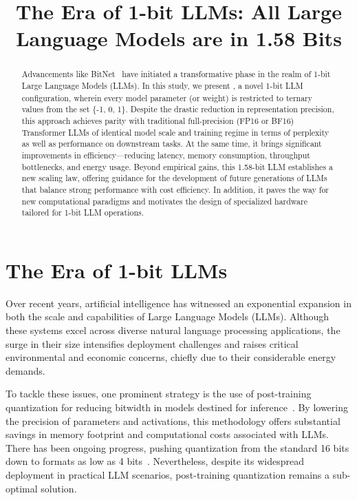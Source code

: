 \title{The Era of 1-bit LLMs: All Large Language Models are in 1.58 Bits}

\begin{abstract}
Advancements like BitNet~\cite{bitnet} have initiated a transformative phase in the realm of 1-bit Large Language Models (LLMs). In this study, we present \textbf{}, a novel 1-bit LLM configuration, wherein every model parameter (or weight) is restricted to ternary values from the set \{-1, 0, 1\}. Despite the drastic reduction in representation precision, this approach achieves parity with traditional full-precision (FP16 or BF16) Transformer LLMs of identical model scale and training regime in terms of perplexity as well as performance on downstream tasks. At the same time, it brings significant improvements in efficiency—reducing latency, memory consumption, throughput bottlenecks, and energy usage. Beyond empirical gains, this 1.58-bit LLM establishes a new scaling law, offering guidance for the development of future generations of LLMs that balance strong performance with cost efficiency. In addition, it paves the way for new computational paradigms and motivates the design of specialized hardware tailored for 1-bit LLM operations.
\end{abstract}

\section{The Era of 1-bit LLMs}

Over recent years, artificial intelligence has witnessed an exponential expansion in both the scale and capabilities of Large Language Models (LLMs). Although these systems excel across diverse natural language processing applications, the surge in their size intensifies deployment challenges and raises critical environmental and economic concerns, chiefly due to their considerable energy demands.

To tackle these issues, one prominent strategy is the use of post-training quantization for reducing bitwidth in models destined for inference~\cite{smoothquant, gptq, quip, quip_sharp}. By lowering the precision of parameters and activations, this methodology offers substantial savings in memory footprint and computational costs associated with LLMs. There has been ongoing progress, pushing quantization from the standard 16 bits down to formats as low as 4 bits~\cite{gptq, awq}. Nevertheless, despite its widespread deployment in practical LLM scenarios, post-training quantization remains a sub-optimal solution.

